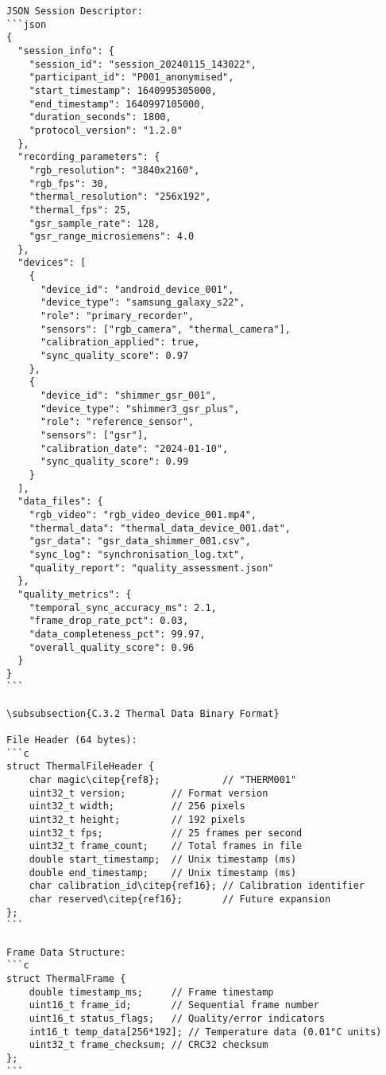 \begin{verbatim}
JSON Session Descriptor:
```json
{
  "session_info": {
    "session_id": "session_20240115_143022",
    "participant_id": "P001_anonymised",
    "start_timestamp": 1640995305000,
    "end_timestamp": 1640997105000,
    "duration_seconds": 1800,
    "protocol_version": "1.2.0"
  },
  "recording_parameters": {
    "rgb_resolution": "3840x2160",
    "rgb_fps": 30,
    "thermal_resolution": "256x192",
    "thermal_fps": 25,
    "gsr_sample_rate": 128,
    "gsr_range_microsiemens": 4.0
  },
  "devices": [
    {
      "device_id": "android_device_001",
      "device_type": "samsung_galaxy_s22",
      "role": "primary_recorder",
      "sensors": ["rgb_camera", "thermal_camera"],
      "calibration_applied": true,
      "sync_quality_score": 0.97
    },
    {
      "device_id": "shimmer_gsr_001",
      "device_type": "shimmer3_gsr_plus",
      "role": "reference_sensor",
      "sensors": ["gsr"],
      "calibration_date": "2024-01-10",
      "sync_quality_score": 0.99
    }
  ],
  "data_files": {
    "rgb_video": "rgb_video_device_001.mp4",
    "thermal_data": "thermal_data_device_001.dat",
    "gsr_data": "gsr_data_shimmer_001.csv",
    "sync_log": "synchronisation_log.txt",
    "quality_report": "quality_assessment.json"
  },
  "quality_metrics": {
    "temporal_sync_accuracy_ms": 2.1,
    "frame_drop_rate_pct": 0.03,
    "data_completeness_pct": 99.97,
    "overall_quality_score": 0.96
  }
}
```

\subsubsection{C.3.2 Thermal Data Binary Format}

File Header (64 bytes):
```c
struct ThermalFileHeader {
    char magic\citep{ref8};           // "THERM001"
    uint32_t version;        // Format version
    uint32_t width;          // 256 pixels
    uint32_t height;         // 192 pixels
    uint32_t fps;            // 25 frames per second
    uint32_t frame_count;    // Total frames in file
    double start_timestamp;  // Unix timestamp (ms)
    double end_timestamp;    // Unix timestamp (ms)
    char calibration_id\citep{ref16}; // Calibration identifier
    char reserved\citep{ref16};       // Future expansion
};
```

Frame Data Structure:
```c
struct ThermalFrame {
    double timestamp_ms;     // Frame timestamp
    uint16_t frame_id;       // Sequential frame number
    uint16_t status_flags;   // Quality/error indicators
    int16_t temp_data[256*192]; // Temperature data (0.01°C units)
    uint32_t frame_checksum; // CRC32 checksum
};
```


\end{verbatim}
